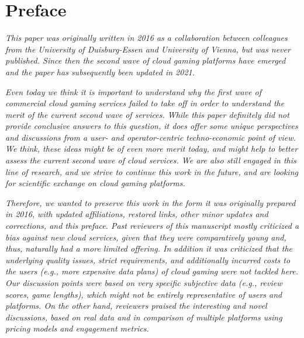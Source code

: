 \section*{Preface}


\textit{This paper was originally written in 2016 as a collaboration between colleagues from the University of Duisburg-Essen and University of Vienna, but was never published. Since then the second wave of cloud gaming platforms have emerged and the paper has subsequently been updated in 2021.} 

\textit{Even today we think it is important to understand why the first wave of commercial cloud gaming services failed to take off in order to understand the merit of the current second wave of services. 
While this paper definitely did not provide conclusive answers to this question, it does offer some unique perspectives and discussions from a user- and operator-centric techno-economic point of view.
We think, these ideas might be of even more merit today, and might help to better assess the current second wave of cloud services. We are also still engaged in this line of research, and we strive to continue this work in the future, and are looking for scientific exchange on cloud gaming platforms.} 

\textit{
Therefore, we wanted to preserve this work in the form it was originally prepared in 2016, with updated affiliations, restored links, other minor updates and corrections, and this preface. Past reviewers of this manuscript mostly criticized a bias against new cloud services, given that they were comparatively young and, thus, naturally had a more limited offering. In addition it was criticized that the underlying quality issues, strict requirements, and additionally incurred costs to the users (e.g., more expensive data plans) of cloud gaming were not tackled here. Our discussion points were based on very specific subjective data (e.g., review scores, game lengths), which might not be entirely representative of users and platforms.
On the other hand, reviewers praised the interesting and novel discussions, based on real data and in comparison of multiple platforms using pricing models and engagement metrics.}
